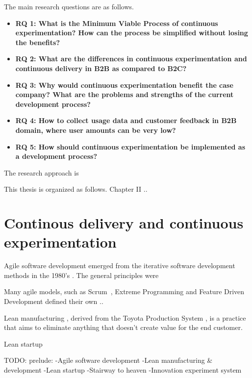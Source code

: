 \documentclass[english]{tktltiki2}
\theoremstyle{definition}
\theoremstyle{remark}
\begin{document}
The main research questions are as follows.
\begin{itemize}
\item  \textbf{RQ 1: What is the Minimum Viable Process of continuous experimentation? How can the process be simplified without losing the benefits?}
\item  \textbf{RQ 2: What are the differences in continuous experimentation and continuous delivery in B2B as compared to B2C?}
\item  \textbf{RQ 3: Why would continuous experimentation benefit the case company? What are the problems and strengths of the current development process?}
\item  \textbf{RQ 4: How to collect usage data and customer feedback in B2B domain, where user amounts can be very low?}
\item  \textbf{RQ 5: How should continuous experimentation be implemented as a development process?}
\end{itemize}

The research approach is %

This thesis is organized as follows. Chapter II ..
%

\section{Continous delivery and continuous experimentation}

Agile software development emerged from the iterative software development methods in the 1980's \cite{}. The general principles were

Many agile models, such as Scrum \cite{}, Extreme Programming \cite{} and Feature Driven Development \cite{} defined their own ..

Lean manufacturing \cite{}, derived from the Toyota Production System \cite{}, is a practice that aims to eliminate anything that doesn't create value for the end customer. 

Lean startup  

TODO: prelude:
-Agile software development
-Lean manufacturing & development
-Lean startup
-Stairway to heaven
-Innovation experiment system
\end{document}
